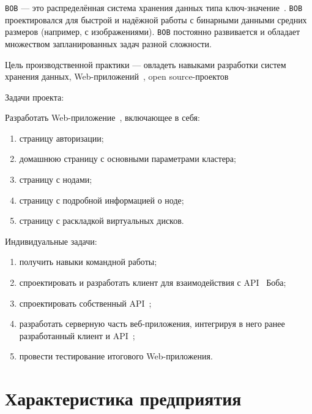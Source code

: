 



	

\normalsize

\setcounter{page}{2}

\tableofcontents
\normalsize

\pagebreak


\texttt{BOB} --- это распределённая система хранения данных типа ключ-значение~\cite{BOB}. \texttt{BOB} проектировался для быстрой и надёжной работы с бинарными данными средних размеров (например, с изображениями). \texttt{BOB} постоянно развивается и обладает множеством запланированных задач разной сложности.

Цель производственной практики --- овладеть навыками разработки систем хранения данных, Web-приложений~\cite{web}, open source-проектов~\cite{oss} 

Задачи проекта:

Разработать Web-приложение~\cite{web}, включающее в себя:
\begin{enumerate}
	\item страницу авторизации;
	\item домашнюю страницу с основными параметрами кластера;
	\item страницу с нодами;
	\item страницу с подробной информацией о ноде;
	\item страницу с раскладкой виртуальных дисков.
\end{enumerate}

Индивидуальные задачи: 

\begin{enumerate}
	\item получить навыки командной работы;
	\item спроектировать и разработать клиент для взаимодействия с API~\cite{api} Боба;
	\item спроектировать собственный API~\cite{api};
	\item разработать серверную часть веб-приложения, интегрируя в него ранее разработанный клиент и API~\cite{api};
	\item провести тестирование итогового Web-приложения.
\end{enumerate}

\clearpage

\section{Характеристика предприятия}

